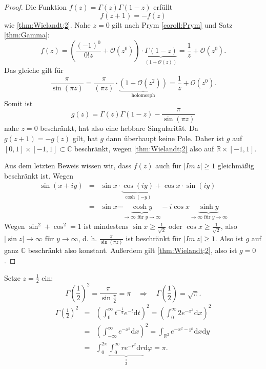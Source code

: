 \documentclass[11pt,titlepage]{article}
\theoremstyle{definition}
\theoremstyle{remark}
\begin{document}
	\begin{proof}
		Die Funktion $f(z)=\Gamma(z)\Gamma(1-z)$ erfüllt
		\[ f(z+1)=-f(z) \]
		wie \ref{thm:Wielandt;2}. Nahe $z=0$ gilt nach Prym \ref{coroll:Prym} und Satz \ref{thm:Gamma}:
		\[ f(z) =\left( \frac{(-1)^0}{0!z}+\mathcal{O}(z^0)\right)\cdot \underbrace{\Gamma(1-z)}_{(1+\mathcal{O}(z))} 
		=\frac{1}{z} +\mathcal{O}(z^0). \]
		Das gleiche gilt für
		\[ \frac{\pi}{\sin(\pi z)}=\frac{ \pi}{(\pi z)}\cdot \underbrace{(1+\mathcal{O}(z^2))}_{\text{holomorph}} 
		= \frac{1}{z} +\mathcal{O}(z^0). \]
		Somit ist
		\[ g(z)=\Gamma(z)\Gamma(1-z)-\frac{\pi}{\sin(\pi z)} \]
		nahe $z=0$ beschränkt, hat also eine hebbare Singularität. Da $g(z+1)=-g(z)$ gilt, hat $g$ dann überhaupt 
		keine Pole. Daher ist $g$ auf $[0,1]\times[-1,1]\subset\mathbb{C}$ beschränkt, wegen 
    		\ref{thm:Wielandt;2} also auf $\mathbb{R}\times [-1,1]$.
		
		
		
		
		Aus dem letzten Beweis wissen wir, dass $f(z)$ auch für $|Im\ z|\geq 1$ gleichmäßig beschränkt ist. 
		Wegen
		\begin{eqnarray*}
			\sin(x+iy)&=&\sin x\cdot \underbrace{\cos(iy)}_{\cosh(-y)} +\cos x\cdot \sin(iy) \\
			&=& \sin x\cdots \underbrace{\cosh y}_{\to \infty \text{ für }y\to \infty} -i\cos x \underbrace{\sinh y}_
			{\to \infty \text{ für }y\to \infty}
		\end{eqnarray*}
		Wegen $\sin^2 +\cos^2 =1$ ist mindestens $\sin x \geq \frac{1}{\sqrt{2}}$ oder $\cos x\geq\frac{1}{\sqrt{2}}$, 
		also $|\sin z|\to\infty$ für $y\to\infty$, d. h. $\frac{\pi}{\sin(\pi z)}$ ist beschränkt für $|Im\ z|\geq 1$. 
		Also ist $g$ auf ganz $\mathbb{C}$ beschränkt also konstant. Außerdem gilt \ref{thm:Wielandt;2}, also ist 
		$g=0$.
	\end{proof}
	
	Setze $z=\frac{1}{2}$ ein:
	\[ \Gamma\left(\frac{1}{2}\right)^2 = \frac{\pi}{\sin \frac{\pi}{2}}=\pi \quad \Rightarrow \quad \Gamma\left(\frac{1}
	{2}\right)=\sqrt{\pi}.\]
	\begin{eqnarray*}
		\Gamma\left(\frac{1}{2}\right)^2 &=& \left( \int_0^{\infty} t^{-\frac{1}{2}}e^{-t}\mathrm{d}t \right)^2 
		=\left(\int_0^{\infty} 2e^{-x^2}\mathrm{d}x\right)^2 \\
		&=& \left( \int_{-\infty}^{\infty}e^{-x^2}\mathrm{d}x\right)^2 = \int_{\mathbb{R}^2} e^{-x^2-y^2}\mathrm{d}x
		\mathrm{d}y \\
		&=& \int_0^{2\pi}\underbrace{\int_0^{\infty}r e^{-r^2} \mathrm{d}r}_{\frac{1}{2}}\mathrm{d}\varphi =\pi.
	\end{eqnarray*}
	
\end{document}
